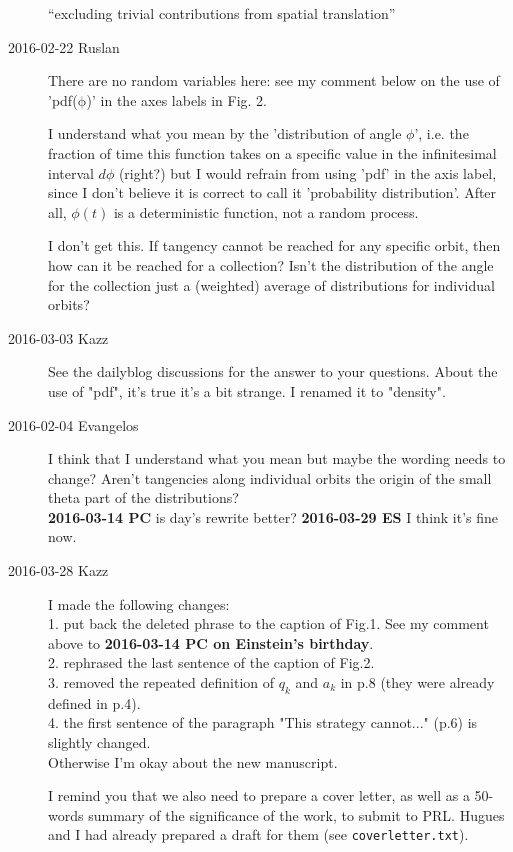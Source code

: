 \begin{description}
``excluding trivial contributions from spatial translation''


\item[2016-02-22 Ruslan]
    {There are no
    random variables here: see my comment below on the use of
    'pdf($\mathrm{\phi}$)' in the axes labels in Fig. 2.}

    {I understand what you mean by the 'distribution of angle $\phi$',
    i.e. the fraction of time this function takes on a specific value in
    the infinitesimal interval $d\phi$ (right?) but I would refrain from
    using 'pdf' in the axis label, since I don't believe it is correct to
    call it 'probability distribution'.  After all, $\phi(t)$ is a
    deterministic function, not a random process.}

    {I don't get this.  If tangency cannot be reached for any specific
    orbit, then how can it be reached for a collection?  Isn't the
    distribution of the angle for the collection just a (weighted)
    average of distributions for individual orbits?}
\item[2016-03-03 Kazz]
    {See the dailyblog discussions for the answer to your questions.
    About the use of "pdf", it's true it's a bit strange. I renamed it to
    "density".}

\item[2016-02-04 Evangelos]
    I think that I understand what you mean but maybe the wording needs
    to change? Aren't tangencies along individual orbits the origin of
    the small theta part of the distributions?
    \\
    {\bf 2016-03-14 PC} is day's rewrite better?
    {\bf 2016-03-29 ES} I think it's fine now.

\item[2016-03-28 Kazz]
I made the following changes:\\
1. put back the deleted phrase to the caption of Fig.1. See my comment above to {\bf 2016-03-14 PC on Einstein's birthday}.\\
2. rephrased the last sentence of the caption of Fig.2.\\
3. removed the repeated definition of $q_k$ and $a_k$ in p.8 (they were already defined in p.4).\\
4. the first sentence of the paragraph "This strategy cannot..." (p.6) is slightly changed.\\
Otherwise I'm okay about the new manuscript.

I remind you that we also need to prepare a cover letter, as well as a 50-words summary of the significance of the work, to submit to PRL. Hugues and I had already prepared a draft for them (see \verb|coverletter.txt|).


\end{description}
